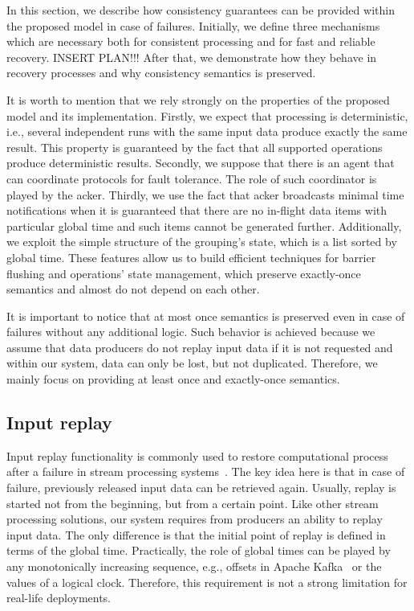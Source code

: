 
\label {fs-consistency-seciton}

In this section, we describe how consistency guarantees can be provided within the proposed model in case of failures. Initially, we define three mechanisms which are necessary both for consistent processing and for fast and reliable recovery. INSERT PLAN!!! After that, we demonstrate how they behave in recovery processes and why consistency semantics is preserved.

It is worth to mention that we rely strongly on the properties of the proposed model and its implementation. Firstly, we expect that processing is deterministic, i.e., several independent runs with the same input data produce exactly the same result. This property is guaranteed by the fact that all supported operations produce deterministic results. Secondly, we suppose that there is an agent that can coordinate protocols for fault tolerance. The role of such coordinator is played by the acker. Thirdly, we use the fact that acker broadcasts minimal time notifications when it is guaranteed that there are no in-flight data items with particular global time and such items cannot be generated further. Additionally, we exploit the simple structure of the grouping's state, which is a list sorted by global time. These features allow us to build efficient techniques for barrier flushing and operations' state management, which preserve exactly-once semantics and almost do not depend on each other.

It is important to notice that at most once semantics is preserved even in case of failures without any additional logic. Such behavior is achieved because we assume that data producers do not replay input data if it is not requested and within our system, data can only be lost, but not duplicated. Therefore, we mainly focus on providing at least once and exactly-once semantics.

\subsection{Input replay}
Input replay functionality is commonly used to restore computational process after a failure in stream processing systems~\cite{Carbone:2017:SMA:3137765.3137777, Akidau:2013:MFS:2536222.2536229, apache:storm}. The key idea here is that in case of failure, previously released input data can be retrieved again. Usually, replay is started not from the beginning, but from a certain point. Like other stream processing solutions, our system requires from producers an ability to replay input data. The only difference is that the initial point of replay is defined in terms of the global time. Practically, the role of global times can be played by any monotonically increasing sequence, e.g., offsets in Apache Kafka~\cite{kreps2011kafka} or the values of a logical clock. Therefore, this requirement is not a strong limitation for real-life deployments.

